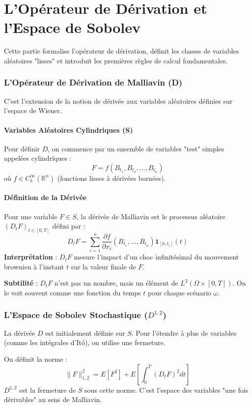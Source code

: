 \documentclass{article}
\begin{document}
\part{L'Opérateur de Dérivation et l'Espace de Sobolev}
Cette partie formalise l'opérateur de dérivation, définit les classes de variables aléatoires "lisses" et introduit les premières règles de calcul fondamentales.

\section{L'Opérateur de Dérivation de Malliavin (D)}
C'est l'extension de la notion de dérivée aux variables aléatoires définies sur l'espace de Wiener.

\subsection{Variables Aléatoires Cylindriques (S)}
Pour définir $D$, on commence par un ensemble de variables "test" simples appelées cylindriques :
\[
F = f(B_{t_1}, B_{t_2}, \dots, B_{t_n})
\]
où $f \in C_b^\infty(\mathbb{R}^n)$ (fonctions lisses à dérivées bornées).

\subsection{Définition de la Dérivée}
Pour une variable $F \in S$, la dérivée de Malliavin est le processus aléatoire $(D_t F)_{t \in [0,T]}$ défini par :
\[
D_t F = \sum_{i=1}^n \frac{\partial f}{\partial x_i} (B_{t_1}, \dots, B_{t_n}) \mathbf{1}_{[0, t_i]}(t)
\]
\textbf{Interprétation} : $D_t F$ mesure l'impact d'un choc infinitésimal du mouvement brownien à l'instant $t$ sur la valeur finale de $F$.

\textbf{Subtilité} : $D_t F$ n'est pas un nombre, mais un élément de $L^2(\Omega \times [0,T])$. On le voit souvent comme une fonction du temps $t$ pour chaque scénario $\omega$.

\section{L'Espace de Sobolev Stochastique ($D^{1,2}$)}
La dérivée $D$ est initialement définie sur $S$. Pour l'étendre à plus de variables (comme les intégrales d'Itô), on utilise une fermeture.

On définit la norme :
\[
\|F\|_{1,2}^2 = E[F^2] + E\left[ \int_0^T (D_t F)^2 dt \right]
\]
$D^{1,2}$ est la fermeture de $S$ sous cette norme. C'est l'espace des variables "une fois dérivables" au sens de Malliavin.
\end{document}
